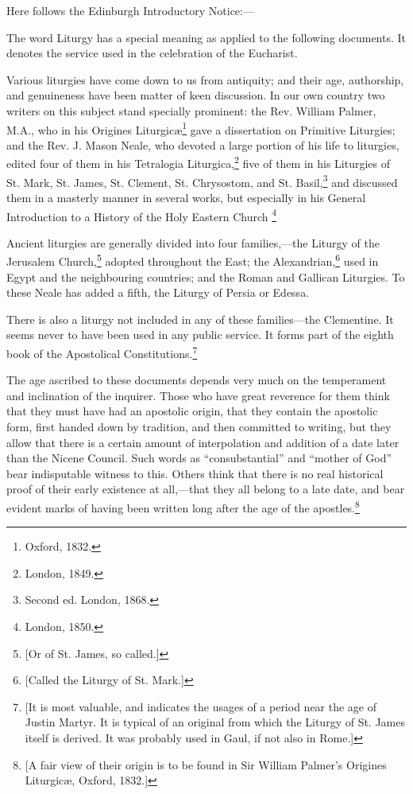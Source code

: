 Here follows the Edinburgh Introductory Notice:—

The word Liturgy has a special meaning as applied to the following documents. It denotes the service used in the celebration of the Eucharist.

Various liturgies have come down to us from antiquity; and their age, authorship, and genuineness have been matter of keen discussion. In our own country two writers on this subject stand specially prominent: the Rev. William Palmer, M.A., who in his Origines Liturgicæ\footnote{\par  Oxford, 1832.} gave a dissertation on Primitive Liturgies; and the Rev. J. Mason Neale, who devoted a large portion of his life to liturgies, edited four of them in his Tetralogia Liturgica,\footnote{\par  London, 1849.} five of them in his Liturgies of St. Mark, St. James, St. Clement, St. Chrysostom, and St. Basil,\footnote{\par  Second ed. London, 1868.} and discussed them in a masterly manner in several works, but especially in his General Introduction to a History of the Holy Eastern Church \footnote{\par  London, 1850.}

Ancient liturgies are generally divided into four families,—the Liturgy of the Jerusalem Church,\footnote{\par{}  [Or of St. James, so called.]} adopted throughout the East; the Alexandrian,\footnote{\par{}  [Called the Liturgy of St. Mark.]} used in Egypt and the neighbouring countries; and the Roman and Gallican Liturgies. To these Neale has added a fifth, the Liturgy of Persia or Edessa.

There is also a liturgy not included in any of these families—the Clementine. It seems never to have been used in any public service. It forms part of the eighth book of the Apostolical Constitutions.\footnote{\par{}  [It is most valuable, and indicates the usages of a period near the age of Justin Martyr. It is typical of an original from which the Liturgy of St. James itself is derived. It was probably used in Gaul, if not also in Rome.]}

The age ascribed to these documents depends very much on the temperament and inclination of the inquirer. Those who have great reverence for them think that they must have had an apostolic origin, that they contain the apostolic form, first handed down by tradition, and then committed to writing, but they allow that there is a certain amount of interpolation and addition of a date later than the Nicene Council. Such words as “consubstantial” and “mother of God” bear indisputable witness to this. Others think that there is no real historical proof of their early existence at all,—that they all belong to a late date, and bear evident marks of having been written long after the age of the apostles.\footnote{\par{}  [A fair view of their origin is to be found in Sir William Palmer’s Origines Liturgicæ, Oxford, 1832.]}

